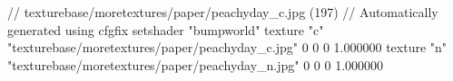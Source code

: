 // texturebase/moretextures/paper/peachyday_c.jpg (197)
// Automatically generated using cfgfix
setshader "bumpworld"
texture "c" "texturebase/moretextures/paper/peachyday_c.jpg" 0 0 0 1.000000
texture "n" "texturebase/moretextures/paper/peachyday_n.jpg" 0 0 0 1.000000
